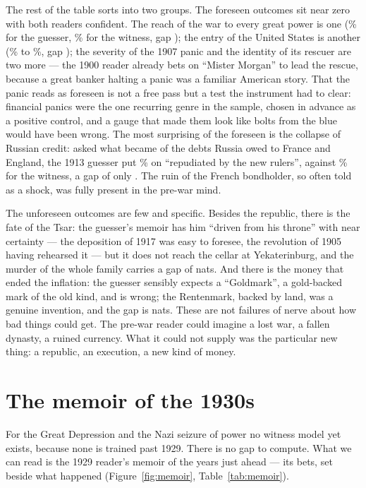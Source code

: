 \documentclass[11pt]{article}
\begin{document}
The rest of the table sorts into two groups. The foreseen outcomes sit near zero with both readers
confident. The reach of the war to every great power is one (\NbreadthPre\% for the guesser, \NbreadthPost\%
for the witness, gap \NbreadthGap{}); the entry of the United States is another (\NusentryPre\% to
\NusentryPost\%, gap \NusentryGap{}); the severity of the 1907 panic and the identity of its rescuer are two
more --- the 1900 reader already bets on ``Mister Morgan'' to lead the rescue, because a great banker
halting a panic was a familiar American story. That the panic reads as foreseen is not a free pass but a
test the instrument had to clear: financial panics were the one recurring genre in the sample, chosen in
advance as a positive control, and a gauge that made them look like bolts from the blue would have been
wrong. The most surprising of the foreseen is the collapse of Russian credit: asked what became of the
debts Russia owed to France and England, the 1913 guesser put \NdebtsPre\% on ``repudiated by the new
rulers'', against \NdebtsPost\% for the witness, a gap of only \NdebtsGap{}. The ruin of the French
bondholder, so often told as a shock, was fully present in the pre-war mind.

The unforeseen outcomes are few and specific. Besides the republic, there is the fate of the Tsar: the
guesser's memoir has him ``driven from his throne'' with near certainty --- the deposition of 1917 was easy
to foresee, the revolution of 1905 having rehearsed it --- but it does not reach the cellar at
Yekaterinburg, and the murder of the whole family carries a gap of \NtsarGap{} nats. And there is the money
that ended the inflation: the guesser sensibly expects a ``Goldmark'', a gold-backed mark of the old kind,
and is wrong; the Rentenmark, backed by land, was a genuine invention, and the gap is \NinflendGap{} nats.
These are not failures of nerve about how bad things could get. The pre-war reader could imagine a lost war,
a fallen dynasty, a ruined currency. What it could not supply was the particular new thing: a republic, an
execution, a new kind of money.

\section{The memoir of the 1930s}\label{sec:memoir}

For the Great Depression and the Nazi seizure of power no witness model yet exists, because none is trained
past 1929. There is no gap to compute. What we can read is the 1929 reader's memoir of the years just ahead
--- its bets, set beside what happened (Figure~\ref{fig:memoir}, Table~\ref{tab:memoir}).
\end{document}
